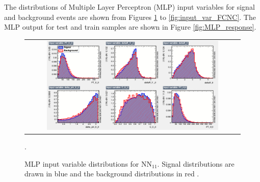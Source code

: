 The distributions of Multiple Layer Perceptron (MLP) input variables for signal and background events are shown from Figures \ref{fig:input_var_1j1b} to \ref{fig:input_var_FCNC}. The MLP output for test and train samples are shown in Figure \ref{fig:MLP_response}.

\begin{figure}[ht]
  \begin{center}
    \begin{tabular}{c}
      \includegraphics[width=0.82\textwidth]{figures/tW/fig/MVA/MLP_1j1b/var_1.png}\\
    \end{tabular}
    \caption{MLP input variable distributions for NN$_{11}$. Signal distributions are drawn in blue and the background distributions in red \cite{CMS-AN-2017-132}.}.
    \label{fig:input_var_1j1b}
  \end{center}
\end{figure}

